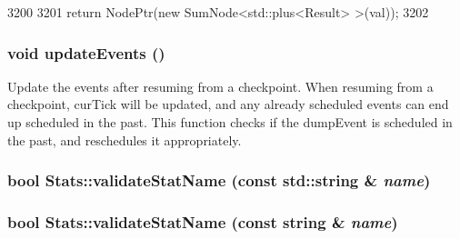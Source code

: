 \begin{DoxyCode}
3200 {
3201     return NodePtr(new SumNode<std::plus<Result> >(val));
3202 }
\end{DoxyCode}
\hypertarget{namespaceStats_a1f815ddbb90ccb7fb9490080dcb6f3c5}{
\subsubsection[{updateEvents}]{\setlength{\rightskip}{0pt plus 5cm}void updateEvents ()}}
\label{namespaceStats_a1f815ddbb90ccb7fb9490080dcb6f3c5}
Update the events after resuming from a checkpoint. When resuming from a checkpoint, curTick will be updated, and any already scheduled events can end up scheduled in the past. This function checks if the dumpEvent is scheduled in the past, and reschedules it appropriately. \hypertarget{namespaceStats_a62d3f8e1a5873346c840f87a24e8b2ee}{
\subsubsection[{validateStatName}]{\setlength{\rightskip}{0pt plus 5cm}bool Stats::validateStatName (const std::string \& {\em name})}}
\label{namespaceStats_a62d3f8e1a5873346c840f87a24e8b2ee}
\hypertarget{namespaceStats_a6bae8e555771c8cb0819d78c60359656}{
\subsubsection[{validateStatName}]{\setlength{\rightskip}{0pt plus 5cm}bool Stats::validateStatName (const string \& {\em name})}}
\label{namespaceStats_a6bae8e555771c8cb0819d78c60359656}



